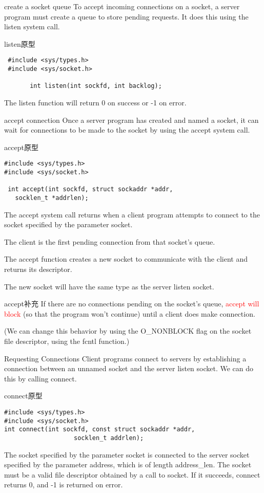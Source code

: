\documentclass{beamer}
\begin{document}
\begin{frame}[fragile]{create a socket queue}
To accept incoming connections on a socket, a server program must create a queue to store pending requests. It does this using the listen system call.
\begin{block}{listen原型}
\begin{verbatim}
 #include <sys/types.h>  
 #include <sys/socket.h>

       int listen(int sockfd, int backlog);
       \end{verbatim}
\end{block}
The listen function will return 0 on success or -1 on error.
\end{frame}

\begin{frame}[fragile]{accept connection}
Once a server program has created and named a socket, it can wait for connections to be made to the socket by using the accept system call.
\begin{block}{accept原型}
\begin{verbatim}
#include <sys/types.h> 
#include <sys/socket.h>

 int accept(int sockfd, struct sockaddr *addr, 
   socklen_t *addrlen);
\end{verbatim}
\end{block}
The accept system call returns when a client program attempts to connect to the socket specified by the parameter socket. 

The client is the first pending connection from that socket’s queue. 

The accept function creates a new socket to communicate with the client and returns its descriptor. 

The new socket will have the same type as the server listen socket.
\end{frame}
\begin{frame}{accept补充}
If there are no connections pending on the socket’s queue, \textcolor{red}{accept will block }(so that the program won’t continue) until a client does make connection. 

(We can change this behavior by using the O\_NONBLOCK flag on the socket file descriptor, using the fcntl function.)
\end{frame}
\begin{frame}[fragile]{Requesting Connections}
Client programs connect to servers by establishing a connection between an unnamed socket and the server listen socket. We can do this by calling connect.
\begin{block}{connect原型}
\begin{verbatim}
#include <sys/types.h>                
#include <sys/socket.h>
int connect(int sockfd, const struct sockaddr *addr,
                   socklen_t addrlen);
\end{verbatim}
\end{block}
The socket specified by the parameter socket is connected to the server socket specified by the parameter address, which is of length address\_len. The socket must be a valid file descriptor obtained by a call to socket.
If it succeeds, connect returns 0, and -1 is returned on error. 
\end{frame}
\end{document}
